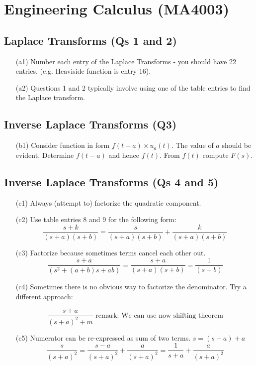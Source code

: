 \documentclass[12pt, a4paper]{article}
\theoremstyle{plain}
\theoremstyle{definition}
\theoremstyle{remark}
\begin{document}
\section*{Engineering Calculus (MA4003)}
\subsection*{Laplace Transforms (Qs 1 and 2)}
\begin{itemize}
\item[(a1)] Number each entry of the Laplace Transforms - you should have 22 entries. (e.g. Heaviside function is entry 16).
\item[(a2)] Questions 1 and 2 typically involve using one of the table entries to find the Laplace transform.
\end{itemize}
\subsection*{Inverse Laplace Transforms (Q3)}
\begin{itemize}
\item[(b1)] Consider function in form $f(t-a) \times u_a(t)$. The value of $a$ should be evident. Determine $f(t-a)$ and hence $f(t)$. From $f(t)$ compute $F(s)$.
\end{itemize}

\subsection*{Inverse Laplace Transforms (Qs 4 and 5)}
\begin{itemize}
\item[(c1)]
Always (attempt to) factorize the quadratic component.
\item[(c2)] Use table entries 8 and 9 for the following form: \[ \frac{s+k}{(s+a)(s+b)} = \frac{s}{(s+a)(s+b)} + \frac{k}{(s+a)(s+b)}  \]
\item[(c3)] Factorize because sometimes terms cancel each other out.
\[ \frac{s+a}{(s^2+(a+b)s + ab)}  = \frac{s+a}{(s+a)(s+b)} = \frac{1}{(s+b)} \]
\item[(c4)]
Sometimes there is no obvious way to factorize the denominator. Try a different approach:

\[ \frac{s+a}{(s+a)^2 + m}  \mbox{ remark: We can use now shifting theorem} \]
\item[(c5)]
Numerator can be re-expressed as sum of two terms. $ s = (s-a) + a $
\[ \frac{s}{(s+a)^2} =  \frac{s-a}{(s+a)^2} + \frac{a}{(s+a)^2}  = \frac{1}{s+a} + \frac{a}{(s+a)^2} \]
\end{itemize}
\end{document}
